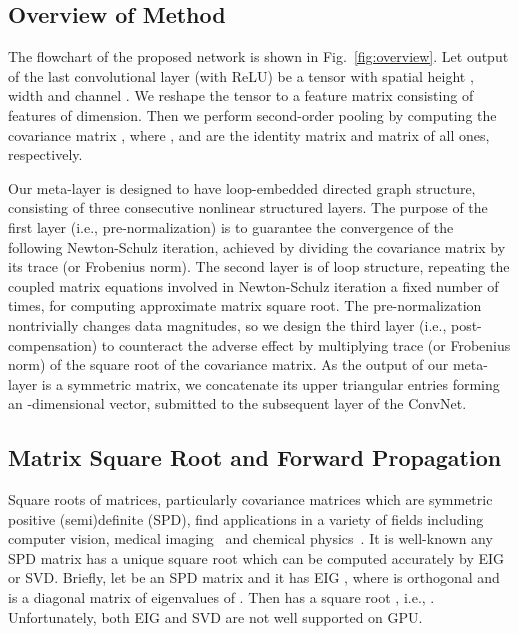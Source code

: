 \documentclass[10pt,twocolumn,letterpaper]{article}
\begin{document}
\subsection{Overview of Method}

The flowchart of the proposed network is shown in Fig.~\ref{fig:overview}. Let  output of the last convolutional layer (with ReLU) be a  tensor  with spatial height , width  and channel . We reshape the tensor to a feature matrix  consisting of  features of dimension. Then we perform second-order pooling by computing the covariance matrix , where ,   and  are the  identity matrix and matrix of all ones, respectively.

Our meta-layer is designed to have loop-embedded directed graph structure, consisting of three consecutive  nonlinear structured layers. The purpose of the first layer (i.e., pre-normalization) is to guarantee the convergence of the following  Newton-Schulz iteration, achieved by dividing the covariance matrix by its trace (or Frobenius norm).  The second layer is of loop structure, repeating the coupled  matrix equations involved in Newton-Schulz iteration a fixed number of times, for computing  approximate matrix  square root. The pre-normalization nontrivially changes  data magnitudes, so we  design the third layer (i.e., post-compensation) to counteract the adverse effect by multiplying trace (or Frobenius norm) of the square root of the covariance matrix.
As the output of our meta-layer  is a symmetric matrix, we concatenate its upper triangular entries forming an -dimensional vector, submitted to the subsequent layer of the ConvNet.


\subsection{Matrix Square Root and Forward Propagation}\label{subsection:forward}


Square roots of matrices, particularly covariance matrices which are symmetric  positive (semi)definite (SPD), find applications in a variety of fields including computer vision, medical imaging~\cite{doi:10.1080/02664763.2015.1080671} and chemical physics~\cite{2007JChPh.126l4104J}.  It is well-known  any SPD matrix has a unique square root which can be computed accurately  by EIG or SVD. Briefly, let  be an SPD matrix and it has EIG , where  is orthogonal and  is a diagonal matrix of eigenvalues  of . Then  has a  square root , i.e., . Unfortunately, both EIG and SVD are not well supported on GPU.
\end{document}
